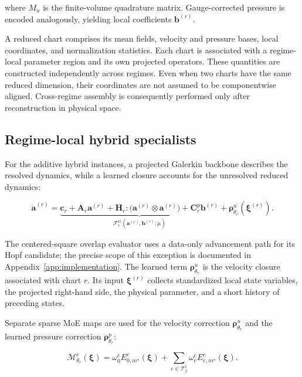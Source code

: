 \documentclass{article}
\begin{document}
where $M_u$ is the finite-volume quadrature matrix. Gauge-corrected pressure is encoded analogously, yielding local coefficients
$\bm b^{(r)}$. 

A reduced chart comprises its mean fields, velocity and pressure bases, local coordinates, and normalization statistics. Each chart is associated with a regime-local parameter region and its own projected operators.
These quantities are constructed independently across regimes. Even when two charts have the same reduced dimension, their coordinates are not assumed to be componentwise aligned. Cross-regime assembly is consequently performed only after reconstruction in physical space.

\subsection{Regime-local hybrid specialists}

For the additive hybrid instances, a projected Galerkin backbone describes the resolved dynamics, while a learned closure accounts for the unresolved reduced dynamics:


\begin{equation}
  \dot{\bm a}^{(r)}=
  \underbrace{\bm c_r+\bm A_r\bm a^{(r)}+
  \bm H_r:\bigl(\bm a^{(r)}\otimes\bm a^{(r)}\bigr)+
  \bm C^p_r\bm b^{(r)}}_{\mathcal F_r^{G}(\bm a^{(r)},\bm b^{(r)};\mu)}
  +\bm\rho^u_{\theta_r}(\bm\xi^{(r)}).
  \label{eq:main_specialist}
\end{equation}


The centered-square overlap evaluator uses a data-only advancement path for its Hopf candidate; the precise scope of this exception is documented in Appendix~\ref{app:implementation}. The learned term $\bm\rho^u_{\theta_r}$ is the velocity closure associated with chart $r$. Its input $\bm\xi^{(r)}$ collects standardized local state variables, the projected right-hand side, the physical parameter, and a short history of preceding states.

Separate sparse MoE maps are used for the velocity correction $\bm\rho^u_{\theta_r}$ and the learned pressure correction $\bm\rho^p_{\theta_r}$:


\begin{equation}
  \mathcal M^c_{\theta_r}(\bm\xi)=
  \omega^c_0 E^c_{0,m^\star}(\bm\xi)+
  \sum_{e\in\mathcal T_2^c}\omega^c_e E^c_{e,m^\star}(\bm\xi).
  \label{eq:main_inner_moe}
\end{equation}
\end{document}
